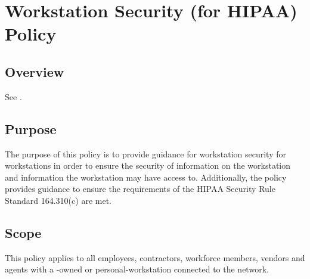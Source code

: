\chapter{Workstation Security (for HIPAA) Policy}
\section{Overview}
See .
\section{Purpose}\label{SS:WSfHP:Pu}
The purpose of this policy is to provide guidance for workstation security for \CompanyName{} workstations in order to ensure the security of information on the workstation and information the workstation may have access to.  
Additionally, the policy provides guidance to ensure the requirements of the HIPAA Security Rule  Standard 164.310(c) are met.
\section{Scope}
This policy applies to all \CompanyName{} employees, contractors, workforce members, vendors\oxford{} and agents with a \CompanyName{}-owned or personal-workstation connected to the \CompanyName{} network.
